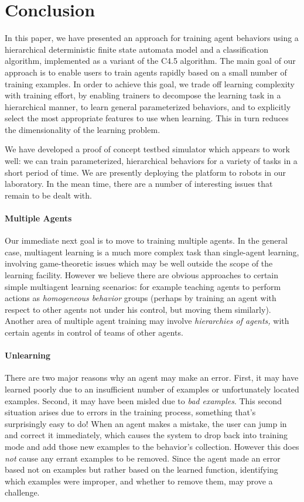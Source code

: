 
\section{Conclusion}

In this paper, we have presented an approach for training agent behaviors using a hierarchical deterministic finite state automata model and a classification algorithm, implemented as a variant of the C4.5 algorithm. The main goal of our approach is to enable users to train agents rapidly based on a small number of training examples.  In order to achieve this goal, we trade off learning complexity with training effort, by enabling trainers to decompose the learning task in a hierarchical manner, to learn general parameterized behaviors, and to explicitly select the most appropriate features to use when learning. This in turn reduces the dimensionality of the learning problem. 

We have developed a proof of concept testbed simulator which appears to work well: we can train parameterized, hierarchical behaviors for a variety of tasks in a short period of time.  We are presently deploying the platform to robots in our laboratory.  In the mean time, there are a number of interesting issues that remain to be dealt with.

\paragraph*{Multiple Agents}  Our immediate next goal is to move to training multiple agents.  In the general case, multiagent learning is a much more complex task than single-agent learning, involving game-theoretic issues which may be well outside the scope of the learning facility.  However we believe there are obvious approaches to certain simple multiagent learning scenarios: for example teaching agents to perform actions as {\it homogeneous behavior} groups (perhaps by training an agent with respect to other agents not under his control, but moving them similarly).  Another area of multiple agent training may involve {\it hierarchies of agents,} with certain agents in control of teams of other agents.

\paragraph*{Unlearning} 
There are two major reasons why an agent may make an error.  First, it may have learned poorly due to an insufficient number of examples or unfortunately located examples.  Second, it may have been misled due to {\it bad examples}.  This second situation arises due to errors in the training process, something that's surprisingly easy to do!  When an agent makes a mistake, the user can jump in and correct it immediately, which causes the system to drop back into training mode and add those new examples to the behavior's collection.  However this does {\it not} cause any errant examples to be removed.  Since the agent made an error based not on examples but rather based on the learned function, identifying which examples were improper, and whether to remove them, may prove a challenge.

